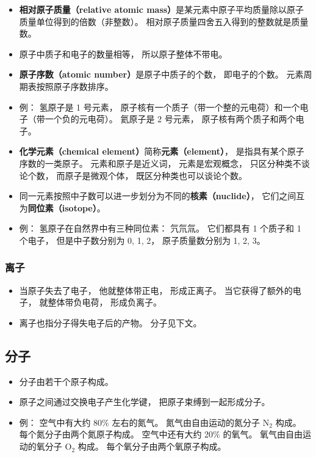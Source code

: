 \begin{itemize}
\item \textbf{相对原子质量（relative atomic mass）}是某元素中原子平均质量除以原子质量单位得到的倍数（非整数）。 相对原子质量四舍五入得到的整数就是质量数。
\item 原子中质子和电子的数量相等， 所以原子整体不带电。
\item \textbf{原子序数（atomic number）}是原子中质子的个数， 即电子的个数。 元素周期表按照原子序数排序。
\item 例： 氢原子是 1 号元素， 原子核有一个质子（带一个整的元电荷）和一个电子（带一个负的元电荷）。 氦原子是 2 号元素， 原子核有两个质子和两个电子。
\item \textbf{化学元素（chemical element）}简称\textbf{元素（element）}， 是指具有某个原子序数的一类原子。 元素和原子是近义词， 元素是宏观概念， 只区分种类不谈论个数， 而原子是微观个体， 既区分种类也可以谈论个数。
\item 同一元素按照中子数可以进一步划分为不同的\textbf{核素（nuclide）}， 它们之间互为\textbf{同位素（isotope）}。
\item 例： 氢原子在自然界中有三种同位素： 氕氘氚。 它们都具有 1 个质子和 1 个电子， 但是中子数分别为 0, 1, 2， 原子质量数分别为 1, 2, 3。
\end{itemize}

\subsubsection{离子}
\begin{itemize}
\item 当原子失去了电子， 他就整体带正电， 形成正离子。 当它获得了额外的电子， 就整体带负电荷， 形成负离子。
\item 离子也指分子得失电子后的产物。 分子见下文。
\end{itemize}

\subsection{分子}
\begin{itemize}
\item 分子由若干个原子构成。
\item 原子之间通过交换电子产生化学键， 把原子束缚到一起形成分子。
\item 例： 空气中有大约 80\% 左右的氮气。 氮气由自由运动的氮分子 $\mathrm{N}_2$ 构成。 每个氮分子由两个氮原子构成。 空气中还有大约 20\% 的氧气。 氧气由自由运动的氧分子 $\mathrm{O}_2$ 构成。 每个氧分子由两个氧原子构成。
\end{itemize}
